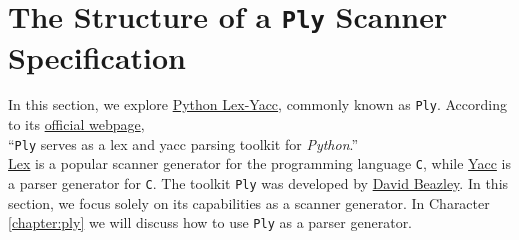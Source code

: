 \section{The Structure of a \texttt{Ply} Scanner Specification}
In this section, we explore \href{https://www.dabeaz.com/ply/}{Python Lex-Yacc},  commonly known as
\texttt{Ply}.  According to its \href{https://www.dabeaz.com/ply/}{official webpage},
\\[0.2cm]
\hspace*{1.3cm}
``\texttt{Ply} serves as a lex and yacc parsing toolkit for \textsl{Python}.''
\\[0.2cm]
\href{https://en.wikipedia.org/wiki/Lex_(software)}{Lex} is a popular scanner generator for the programming
language \texttt{C}, while \href{https://en.wikipedia.org/wiki/Yacc}{Yacc} is a parser generator for
\texttt{C}.  The toolkit \texttt{Ply} was developed by
\href{https://www.dabeaz.com/}{David Beazley}. In this section, we focus solely on its capabilities as a
scanner generator.  In Character \ref{chapter:ply} we will discuss how to use \texttt{Ply} as a parser generator. 

